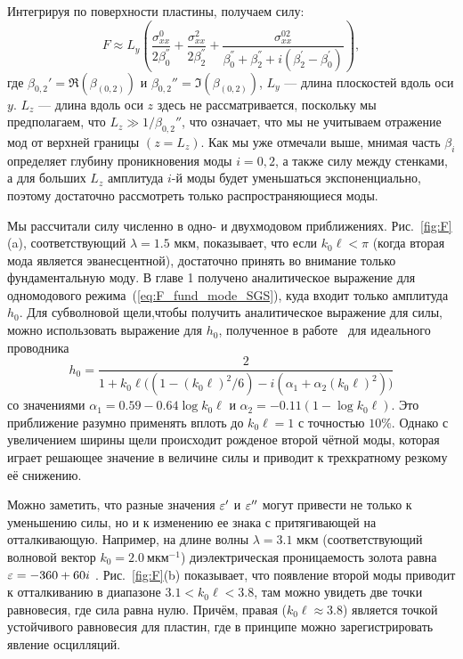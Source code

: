 Интегрируя по поверхности пластины, получаем силу:
\begin{equation}
F \approx L_y \left(\frac{\sigma_{xx}^0}{2 \beta_0^{''}} + \frac{\sigma_{xx}^2}{2 \beta_2^{''}} +  \frac{\sigma_{xx}^{02}}{\beta_0^{''} + \beta_2^{''} + i (\beta_2^{'} - \beta_0^{'})}\right),
\end{equation}
где $\beta_{0,2}'=\Re(\beta_{(0,2)})$ и $\beta_{0,2}''=\Im(\beta_ {(0,2) })$, $L_y$ --- длина плоскостей вдоль оси $y$. $L_z$ --- длина вдоль оси $z$ здесь не рассматривается, поскольку мы предполагаем, что $L_z\gg1/\beta_{0,2}''$, что означает, что мы не учитываем отражение мод от верхней границы $(z = L_z)$. Как мы уже отмечали выше, мнимая часть $\beta_i$ определяет глубину проникновения моды $i = 0,2$, а также силу между стенками, а для больших $L_z$ амплитуда $i$-й моды будет уменьшаться экспоненциально, поэтому достаточно рассмотреть только распространяющиеся моды.
 
 Мы рассчитали силу численно в одно- и двухмодовом приближениях. Рис.~\ref{fig:F}(a), соответствующий $\lambda = 1.5$ мкм, показывает, что если $k_0\ell <\pi$
(когда вторая мода является эванесцентной), достаточно принять во внимание только фундаментальную моду. В главе 1 получено аналитическое выражение для одномодового режима~(\ref{eq:F_fund_mode_SGS}),  куда входит только амплитуда $h_0$. Для субволновой щели,чтобы получить аналитическое выражение для силы, можно использовать выражение для $h_0$, полученное в работе~\cite{Shapiro16} для идеального проводника
\begin{equation}
    h_0 = \frac{2}{1 + k_0\ell\Big( (1 - (k_0\ell)^2/6) -i(\alpha_1 + \alpha_2 (k_0\ell)^2)  \Big)}
\end{equation}
со значениями $\alpha_1 = 0.59 - 0.64\log{k_0 \ell}$ и $\alpha_2 = -0.11(1-\log{k_0 \ell})$.
Это приближение разумно применять вплоть до $k_0 \ell=1$ с точностью $10\%$. 
Однако с увеличением ширины щели происходит рожденое второй чётной моды, которая играет решающее значение в величине силы и приводит к трехкратному резкому её снижению. 

Можно заметить, что разные значения $\varepsilon'$ и $\varepsilon''$ могут привести не только к уменьшению силы, но и к изменению ее знака с притягивающей на отталкивающую. Например, на длине волны $\lambda = 3.1$ мкм (соответствующий волновой вектор $k_0 = 2.0~\text{мкм}^{-1}$) диэлектрическая проницаемость золота равна $\varepsilon = -360 + 60i$ \cite{Palik98}. Рис.~\ref{fig:F}(b) показывает, что появление второй моды приводит к отталкиванию в диапазоне $3.1 <k_0\ell<3.8$,
там можно увидеть две точки равновесия, где сила равна нулю. Причём, правая ($k_0 \ell \approx 3.8$) является точкой устойчивого равновесия для пластин, где
в  принципе можно зарегистрировать явление осцилляций. 

